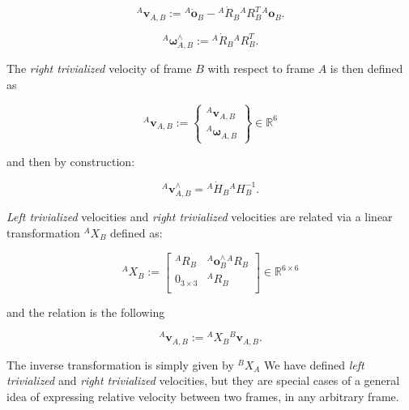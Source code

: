     \begin{equation}
    {}^{A}\bm{v}_{A,B} := {}^{A}\dot{ \mathbf{o}}_B -  {}^{A}\dot{ {R}}_B{}^{A} {R}^{T}_B{}^{A} \mathbf{o}_B.
    \end{equation}

    \begin{equation}
    {}^{A}\bm{\omega}^{\wedge}_{A,B} := {}^{A}\dot{ {R}}_B{}^{A} {R}^{T}_B.
    \end{equation}

    The \textit{right trivialized} velocity of frame $B$ with respect to frame $A$ is then defined as 
    
    \begin{equation}
    {}^{A} \mathbf{v}_{A,B} := \begin{Bmatrix} {}^{A}\bm{v}_{A,B} \\ {}^{A}\bm{\omega}_{A,B} \end{Bmatrix} \in \mathbb{R}^6
    \label{eq: Right trivialized veocity}
    \end{equation}

    and then by construction:

    \begin{equation}
    {}^{A} \mathbf{v}^{\wedge}_{A,B} = {}^{A}\dot{ {H}}_B{}^{A} {H}^{-1}_B.
    \end{equation}

    \textit{Left trivialized} velocities and \textit{right trivialized} velocities are related via a linear transformation ${}^{A}X_B$ defined as:

    \begin{equation}
    {}^{A} {X}_B := \begin{bmatrix}
    {}^{A} {R}_B & {}^{A} \mathbf{o}^{\wedge}_B{}^{A} {R}_B \\
     {0}_{3 \times 3} & {}^{A} {R}_B\\
    \end{bmatrix} \in \mathbb{R}^{6 \times 6}
    \end{equation} 

    and the relation is the following

    \begin{equation}
    {}^{A} \mathbf{v}_{A,B} := {}^{A} {X}_B {}^{B} \mathbf{v}_{A,B}.
    \end{equation} 

    The inverse transformation is simply given by ${}^{B} {X}_A$
    We have defined \textit{left trivialized} and \textit{right trivialized} velocities, but they are special cases of a general idea of expressing relative velocity between two frames, in any arbitrary frame.

